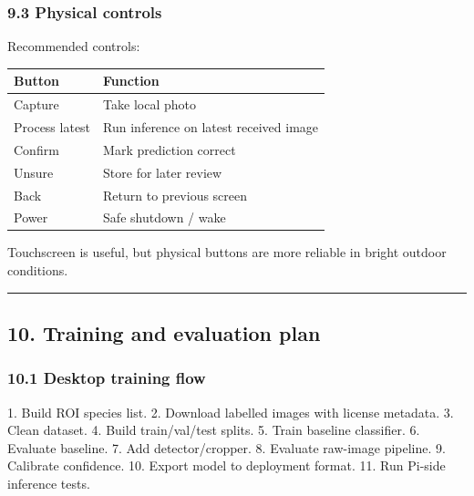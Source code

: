 \documentclass[
  11pt,
]{article}
\newenvironment{Shaded}{}{}
\newcommand{\NormalTok}[1]{#1}
\begin{document}
\subsubsection{9.3 Physical controls}\label{physical-controls}

Recommended controls:

\begin{longtable}[]{@{}ll@{}}
\toprule\noalign{}
Button & Function \\
\midrule\noalign{}
\endhead
\bottomrule\noalign{}
\endlastfoot
Capture & Take local photo \\
Process latest & Run inference on latest received image \\
Confirm & Mark prediction correct \\
Unsure & Store for later review \\
Back & Return to previous screen \\
Power & Safe shutdown / wake \\
\end{longtable}

Touchscreen is useful, but physical buttons are more reliable in bright
outdoor conditions.

\begin{center}\rule{0.5\linewidth}{0.5pt}\end{center}

\subsection{10. Training and evaluation
plan}\label{training-and-evaluation-plan}

\subsubsection{10.1 Desktop training flow}\label{desktop-training-flow}

\begin{Shaded}
\begin{Highlighting}[]
\NormalTok{1. Build ROI species list.}
\NormalTok{2. Download labelled images with license metadata.}
\NormalTok{3. Clean dataset.}
\NormalTok{4. Build train/val/test splits.}
\NormalTok{5. Train baseline classifier.}
\NormalTok{6. Evaluate baseline.}
\NormalTok{7. Add detector/cropper.}
\NormalTok{8. Evaluate raw{-}image pipeline.}
\NormalTok{9. Calibrate confidence.}
\NormalTok{10. Export model to deployment format.}
\NormalTok{11. Run Pi{-}side inference tests.}
\end{Highlighting}
\end{Shaded}
\end{document}
